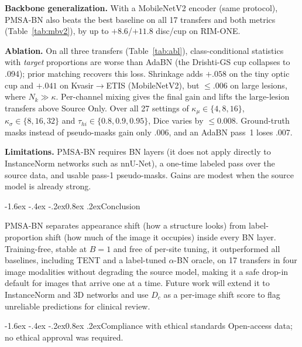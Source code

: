 \documentclass{article}
\makeatletter
\renewcommand\section{\@startsection{section}{1}{\z@}%
  {-1.6ex \@plus -.4ex \@minus -.2ex}{0.8ex \@plus .2ex}{\normalfont}}
\makeatother
\begin{document}
\textbf{Backbone generalization.} With a MobileNetV2 encoder (same protocol), PMSA-BN also beats the best baseline on all 17 transfers and both metrics (Table~\ref{tab:mbv2}), by up to $+8.6$/$+11.8$ disc/cup on RIM-ONE.


\textbf{Ablation.} On all three transfers (Table~\ref{tab:abl}), class-conditional statistics with \emph{target} proportions are worse than AdaBN (the Drishti-GS cup collapses to .094); prior matching recovers this loss. Shrinkage adds $+.058$ on the tiny optic cup and $+.041$ on Kvasir$\to$ETIS (MobileNetV2), but ${\le}.006$ on large lesions, where $N_k\gg\kappa$. Per-channel mixing gives the final gain and lifts the large-lesion transfers above Source Only. Over all 27 settings of
$\kappa_\mu\in\{4,8,16\}$, $\kappa_\sigma\in\{8,16,32\}$ and $\tau_{hi}\in\{0.8,0.9,0.95\}$, Dice varies by ${\le}0.008$. Ground-truth masks instead of pseudo-masks gain only .006, and an AdaBN pass~1 loses .007.

\textbf{Limitations.} PMSA-BN requires BN layers (it does not apply directly to InstanceNorm networks such as nnU-Net), a one-time labeled pass over the source data, and usable pass-1 pseudo-masks. Gains are modest when the source model is already strong.

\section{Conclusion}
\label{sec:conclusion}

PMSA-BN separates appearance shift (how a structure looks) from label-proportion shift (how much of the image it occupies) inside every BN layer. Training-free, stable at $B{=}1$ and free of per-site tuning, it outperformed all baselines, including TENT and a label-tuned $\alpha$-BN oracle, on 17 transfers in four image modalities without degrading the source model, making it a safe drop-in default for images that arrive one at a time. Future work will extend it to InstanceNorm and 3D networks and use $D_c$ as a per-image shift score to flag unreliable predictions for clinical review.

\section{Compliance with ethical standards}
\label{sec:ethics}
Open-access data; no ethical approval was required.
\end{document}
